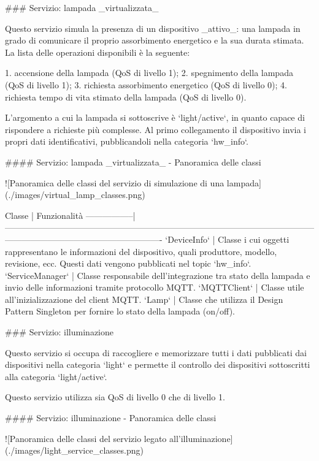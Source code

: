 ### Servizio: lampada _virtualizzata_

Questo servizio simula la presenza di un dispositivo _attivo_: una lampada in grado di comunicare il proprio assorbimento energetico e la sua durata stimata.
La lista delle operazioni disponibili è la seguente:

1.  accensione della lampada (QoS di livello 1);
2.  spegnimento della lampada (QoS di livello 1);
3.  richiesta assorbimento energetico (QoS di livello 0);
4.  richiesta tempo di vita stimato della lampada (QoS di livello 0).

L'argomento a cui la lampada si sottoscrive è `light/active`, in quanto capace di rispondere a richieste più complesse. Al primo collegamento il dispositivo invia i propri dati identificativi, pubblicandoli nella categoria `hw_info`.

#### Servizio: lampada _virtualizzata_ - Panoramica delle classi

![Panoramica delle classi del servizio di simulazione di una  lampada](./images/virtual_lamp_classes.png)

Classe           | Funzionalità
-----------------|-------------------------------------------------------------------------------------------------------------------------------------------------------------------
`DeviceInfo`     | Classe i cui oggetti rappresentano le informazioni del dispositivo, quali produttore, modello, revisione, ecc. Questi dati vengono pubblicati nel topic `hw_info`.
`ServiceManager` | Classe responsabile dell'integrazione tra stato della lampada e invio delle informazioni tramite protocollo MQTT.
`MQTTClient`     | Classe utile all'inizializzazione del client MQTT.
`Lamp`           | Classe che utilizza il Design Pattern Singleton per fornire lo stato della lampada (on/off).

### Servizio: illuminazione

Questo servizio si occupa di raccogliere e memorizzare tutti i dati pubblicati dai dispositivi nella categoria `light` e permette il controllo dei dispositivi sottoscritti alla categoria `light/active`.

Questo servizio utilizza sia QoS di livello 0 che di livello 1.

#### Servizio: illuminazione - Panoramica delle classi

![Panoramica delle classi del servizio legato all'illuminazione](./images/light_service_classes.png)

